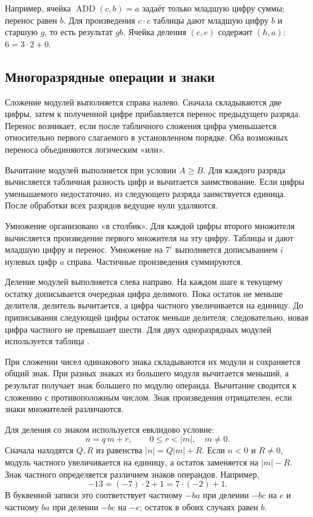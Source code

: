 \documentclass[14pt,a4paper]{extarticle}
\newcommand{\code}[1]{\texttt{\detokenize{#1}}}
\begin{document}
Например, ячейка $\operatorname{ADD}(c,b)=a$ задаёт только младшую цифру суммы; перенос равен $b$. Для произведения $c\cdot c$ таблицы дают младшую цифру $b$ и старшую $g$, то есть результат $gb$. Ячейка деления $(c,e)$ содержит $(h,a)$: $6=3\cdot2+0$.

\subsection{Многоразрядные операции и знаки}

Сложение модулей выполняется справа налево. Сначала складываются две цифры, затем к полученной цифре прибавляется перенос предыдущего разряда. Перенос возникает, если после табличного сложения цифра уменьшается относительно первого слагаемого в установленном порядке. Оба возможных переноса объединяются логическим «или».

Вычитание модулей выполняется при условии $A\geq B$. Для каждого разряда вычисляется табличная разность цифр и вычитается заимствование. Если цифры уменьшаемого недостаточно, из следующего разряда заимствуется единица. После обработки всех разрядов ведущие нули удаляются.

Умножение организовано «в столбик». Для каждой цифры второго множителя вычисляется произведение первого множителя на эту цифру. Таблицы \code{MUL} и \code{MULHI} дают младшую цифру и перенос. Умножение на $7^i$ выполняется дописыванием $i$ нулевых цифр $a$ справа. Частичные произведения суммируются.

Деление модулей выполняется слева направо. На каждом шаге к текущему остатку дописывается очередная цифра делимого. Пока остаток не меньше делителя, делитель вычитается, а цифра частного увеличивается на единицу. До приписывания следующей цифры остаток меньше делителя; следовательно, новая цифра частного не превышает шести. Для двух одноразрядных модулей используется таблица \code{DIV}.

При сложении чисел одинакового знака складываются их модули и сохраняется общий знак. При разных знаках из большего модуля вычитается меньший, а результат получает знак большего по модулю операнда. Вычитание сводится к сложению с противоположным числом. Знак произведения отрицателен, если знаки множителей различаются.

Для деления со знаком используется евклидово условие:
\[
n=q\,m+r,\qquad 0\leq r<|m|,\quad m\neq0.
\]
Сначала находятся $Q,R$ из равенства $|n|=Q|m|+R$. Если $n<0$ и $R\neq0$, модуль частного увеличивается на единицу, а остаток заменяется на $|m|-R$. Знак частного определяется различием знаков операндов. Например,
\[
-13=(-7)\cdot2+1=7\cdot(-2)+1.
\]
В буквенной записи это соответствует частному $-ba$ при делении $-bc$ на $e$ и частному $ba$ при делении $-bc$ на $-e$; остаток в обоих случаях равен $b$.
\end{document}
